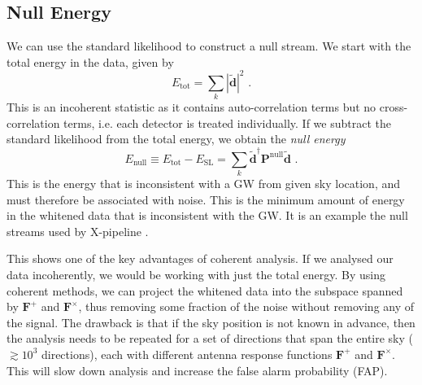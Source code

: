 \documentclass[11pt]{cuthesis}
\newcommand{\fs}{\text{ .}}
\newcommand{\tbd}{\tilde{\textbf{d}}}
\newcommand{\xp}{X-pipeline }
\begin{document}
\subsection{Null Energy}
We can use the standard likelihood to construct a null stream. We start with the total energy in the data, given by
\begin{equation}
E_\text{tot}=\sum_k | \tbd |^2 \fs
\end{equation}
This is an incoherent statistic as it contains auto-correlation terms but no cross-correlation terms, i.e. each detector is treated individually. If we subtract the standard likelihood from the total energy, we obtain the \emph{null energy}
\begin{equation} \label{Enull}
E_\text{null} \equiv E_\text{tot}-E_\text{SL}=\sum_k \tbd ^\dagger \textbf{P}^\text{null} \tbd \fs
\end{equation}
This is the energy that is inconsistent with a GW from given sky location, and must therefore be associated with noise. This is the minimum amount of energy in the whitened data that is inconsistent with the GW. It is an example the null streams used by \xp.

This shows one of the key advantages of coherent analysis. If we analysed our data incoherently, we would be working with just the total energy. By using coherent methods, we can project the whitened data into the subspace spanned by $\textbf{F}^+$ and $\textbf{F}^\times$, thus removing some fraction of the noise without removing any of the signal. The drawback is that if the sky position is not known in advance, then the analysis needs to be repeated for a set of directions that span the entire sky ($\gtrsim 10^3$ directions), each with different antenna response functions $\textbf{F}^+$ and $\textbf{F}^\times$. This will slow down analysis and increase the false alarm probability (FAP).
\end{document}
